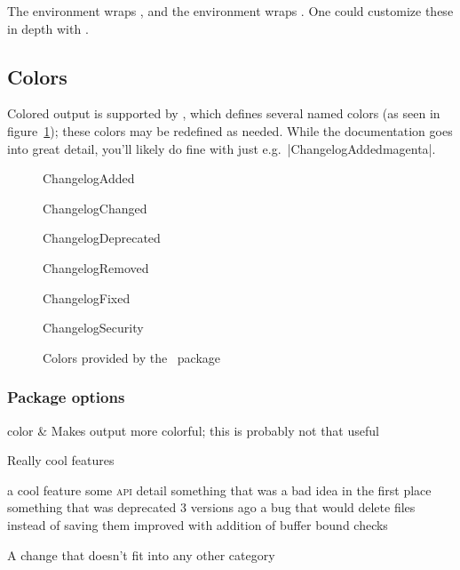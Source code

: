 \documentclass{ltxdoc}
\begin{document}
The  environment wraps , and the
 environment wraps . One could customize these in
depth with .

\subsection{Colors}

Colored output is supported by , which defines several named
colors (as seen in figure~\ref{fig:colors}); these colors may be redefined
as needed. While the  documentation goes into great detail,
you'll likely do fine with just e.g.\ |{ChangelogAdded}{magenta}|.

\begin{figure}[h]
	\centering
	\begin{adjustwidth}{1in}{1in}
	\begin{colorlist}
		\item{ChangelogAdded}
		\item{ChangelogChanged}
		\item{ChangelogDeprecated}
		\item{ChangelogRemoved}
		\item{ChangelogFixed}
		\item{ChangelogSecurity}
	\end{colorlist}
	\end{adjustwidth}
	\caption{Colors provided by the \cl\ package}
	\label{fig:colors}
\end{figure}

\subsubsection{Package options}

\begin{Optionlist}
	color & Makes output more colorful; this is probably not that useful
\end{Optionlist}

\begin{changelog}[author=Rebecca Turner,
	sectioncmd=\subsection,
	title=Example changelog]
\begin{version}
	\added Really cool features
\end{version}

\begin{version}[v=1.0.0, date=2018-10-26]
	\added a cool feature
	\changed some \textsc{api} detail
	\deprecated something that was a bad idea in the first place
	\removed something that was deprecated 3 versions ago
	\fixed a bug that would delete files instead of saving them
	\security improved with addition of buffer bound checks
	\item A change that doesn't fit into any other category
\end{version}
\end{changelog}
\end{document}
